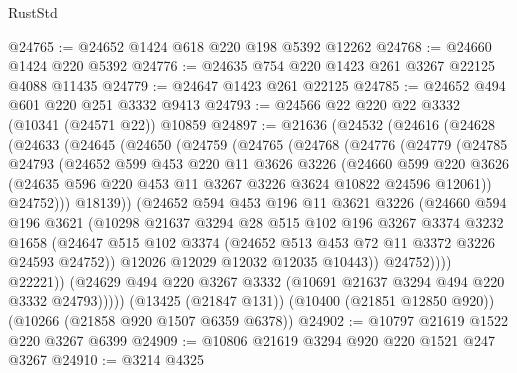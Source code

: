\begin{lexlean}{RustStd}
\begin{coremodule}
@24765 := @24652 @1424 @618 @220 @198 @5392 @12262
@24768 := @24660 @1424 @220 @5392
@24776 := @24635 @754 @220 @1423 @261 @3267 @22125 @4088 @11435
@24779 := @24647 @1423 @261 @22125
@24785 := @24652 @494 @601 @220 @251 @3332 @9413
@24793 := @24566 @22 @220 @22 @3332 (@10341 (@24571 @22)) @10859
@24897 := @21636
    (@24532
      (@24616
        (@24628
          (@24633
            (@24645
              (@24650
                (@24759
                  (@24765
                    (@24768
                      (@24776
                        (@24779
                          (@24785
                            @24793
                            (@24652
                              @599
                              @453
                              @220
                              @11
                              @3626
                              @3226
                              (@24660
                                @599
                                @220
                                @3626
                                (@24635 @596 @220 @453 @11 @3267 @3226 @3624 @10822 @24596 @12061))
                              @24752)))
                        @18139))
                    (@24652
                      @594
                      @453
                      @196
                      @11
                      @3621
                      @3226
                      (@24660
                        @594
                        @196
                        @3621
                        (@10298
                          @21637
                          @3294
                          @28
                          @515
                          @102
                          @196
                          @3267
                          @3374
                          @3232
                          @1658
                          (@24647
                            @515
                            @102
                            @3374
                            (@24652 @513 @453 @72 @11 @3372 @3226 @24593 @24752))
                          @12026
                          @12029
                          @12032
                          @12035
                          @10443))
                      @24752))))
              @22221))
          (@24629 @494 @220 @3267 @3332 (@10691 @21637 @3294 @494 @220 @3332 @24793)))))
    (@13425 (@21847 @131))
    (@10400 (@21851 @12850 @920))
    (@10266 (@21858 @920 @1507 @6359 @6378))
@24902 := @10797 @21619 @1522 @220 @3267 @6399
@24909 := @10806 @21619 @3294 @920 @220 @1521 @247 @3267
@24910 := @3214 @4325

\end{coremodule}
\end{lexlean}
